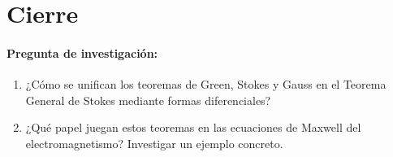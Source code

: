 \documentclass[a4,11pt]{aleph-notas}
\begin{document}
\section*{Cierre}


\paragraph{Pregunta de investigación:}
\begin{enumerate}[leftmargin=*]
    \item ¿Cómo se unifican los teoremas de Green, Stokes y Gauss en el Teorema General de Stokes mediante formas diferenciales?
    \item ¿Qué papel juegan estos teoremas en las ecuaciones de Maxwell del electromagnetismo? Investigar un ejemplo concreto.
\end{enumerate}

\end{document}
